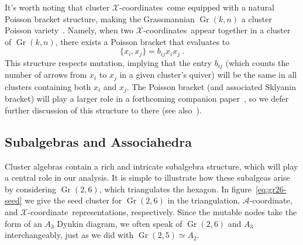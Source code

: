 \documentclass[11pt]{article}
\DeclareMathOperator{\Gr}{Gr}
\def\xcoord{$\mathcal{X}$-coordinate}
\def\xcoords{$\mathcal{X}$-coordinates}
\def\acoord{$\mathcal{A}$-coordinate}
\begin{document}
It's worth noting that cluster \xcoords\ come equipped with a natural Poisson bracket structure, making the Grassmannian $\Gr(k,n)$ a cluster Poisson variety~\cite{}. Namely, when two \xcoords\ appear together in a cluster of $\Gr(k,n)$, there exists a Poisson bracket that evaluates to
\begin{equation}
\{x_i, x_j \} = b_{ij} x_i x_j \ .
\end{equation}
This structure respects mutation, implying that the entry $b_{ij}$ (which counts the number of arrows from $x_i$ to $x_j$ in a given cluster's quiver) will be the same in all clusters containing both $x_i$ and $x_j$. The Poisson bracket (and associated Sklyanin bracket) will play a larger role in a forthcoming companion paper~\cite{}, so we defer further discussion of this structure to there (see also~\cite{PoissonVarieties,Vergu:2015svm}).

\subsection{Subalgebras and Associahedra}\label{sec:subalgebras_associahedra}

Cluster algebras contain a rich and intricate subalgebra structure, which will play a central role in our analysis. It is simple to illustrate how these subalgeas arise by considering $\Gr(2,6)$, which triangulates the hexagon. In figure~\ref{eq:gr26-seed} we give the seed cluster for $\Gr(2,6)$ in the triangulation, \acoord, and \xcoord\ representations, respectively. Since the mutable nodes take the form of an $A_3$ Dynkin diagram, we often speak of $\Gr(2,6)$ and $A_3$ interchangeably, just as we did with $\Gr(2,5) \simeq A_2$. 
\end{document}
